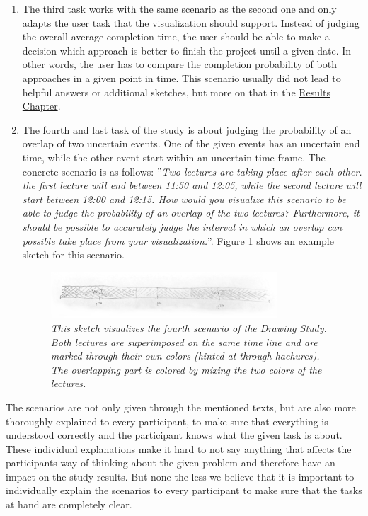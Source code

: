 \begin{enumerate}
	\item The third task works with the same scenario as the second one and only adapts the user task that the visualization should support. Instead of judging the overall average completion time, the user should be able to make a decision which approach is better to finish the project until a given date. In other words, the user has to compare the completion probability of both approaches in a given point in time. This scenario usually did not lead to helpful answers or additional sketches, but more on that in the \hyperref[ch:results]{Results Chapter}.
	
	\item The fourth and last task of the study is about judging the probability of an overlap of two uncertain events. One of the given events has an uncertain end time, while the other event start within an uncertain time frame. The concrete scenario is as follows: ''\textit{Two lectures are taking place after each other. the first lecture will end between 11:50 and 12:05, while the second lecture will start between 12:00 and 12:15. How would you visualize this scenario to be able to judge the probability of an overlap of the two lectures? Furthermore, it should be possible to accurately judge the interval in which an overlap can possible take place from your visualization.}''. Figure \ref{fig:drawingT4} shows an example sketch for this scenario.
	
	\begin{figure}[H]
		\centering
		\includegraphics[width=0.8\textwidth]{figures/drawingT4.png}
		\caption{\textit{This sketch visualizes the fourth scenario of the Drawing Study. Both lectures are superimposed on the same time line and are marked through their own colors (hinted at through hachures). The overlapping part is colored by mixing the two colors of the lectures.}}
		\label{fig:drawingT4}
	\end{figure}
\end{enumerate} 

The scenarios are not only given through the mentioned texts, but are also more thoroughly explained to every participant, to make sure that everything is understood correctly and the participant knows what the given task is about. These individual explanations make it hard to not say anything that affects the participants way of thinking about the given problem and therefore have an impact on the study results. But none the less we believe that it is important to individually explain the scenarios to every participant to make sure that the tasks at hand are completely clear. \par \medskip


